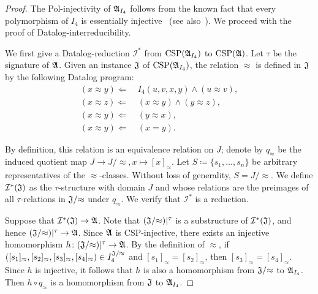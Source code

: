 \begin{proof}
The Pol-injectivity of $\mathfrak{A}_{I_4}$ follows from the known fact that every polymorphism of $I_4$ is essentially injective~\cite{BodChenPinsker} (see also~\cite[Lemma~7.5.1]{bodirsky2021complexity}). We proceed with the proof of Datalog-interreducibility.

We first give a Datalog-reduction $\mathcal{I}^{\ast}$ from $\mathrm{CSP}(\mathfrak{A}_{I_4})$ to $\mathrm{CSP}(\mathfrak{A})$.
%
Let $\tau$ be the signature of $\mathfrak{A}$.
%
Given an instance $\mathfrak{J}$ of $\mathrm{CSP}(\mathfrak{A}_{I_4})$, the relation $\approx$ is defined in $\mathfrak{J}$ by the following Datalog program:
%
\begin{align*}  
  (x\approx y)  \Leftarrow \ & I_4(u,v,x,y) \wedge  (u\approx v), \\
  (x\approx z)  \Leftarrow  \ &  (x\approx y)  \wedge (y\approx z), \\
  (x\approx y)  \Leftarrow \ &  (y\approx x), \\
  (x\approx y) \Leftarrow \ &  (x=y).
\end{align*} 

By definition, this relation is an equivalence relation on $J$; denote by $q_{\approx}$ be the induced quotient map $J\rightarrow J/{\approx}, x\mapsto [x]_{\approx} $.
%  
Let $S\coloneqq \{s_1,\dots, s_n\}$ be arbitrary representatives of the ${\approx}$-classes.
%
Without loss of generality, $S = J/{\approx} $.
%
We define $\mathcal{I}^{\ast}(\mathfrak{J})$ as the $\tau$-structure with domain $J$ and whose relations are the preimages of all $\tau$-relations in $\mathfrak{J}/{\approx}$ under $q_{\approx}$.
%
We verify that $\mathcal{I}^{\ast}$ is a reduction. 

Suppose that $\mathcal{I}^{\ast}(\mathfrak{J}) \rightarrow \mathfrak{A}$.
%
Note that $(\mathfrak{J}/{\approx})|^{\tau}$ is a substructure of $\mathcal{I}^{\ast}(\mathfrak{J})$, and hence $(\mathfrak{J}/{\approx})|^{\tau}\rightarrow \mathfrak{A}$.
% 
Since $\mathfrak{A}$ is CSP-injective, there exists an injective homomorphism $h \colon (\mathfrak{J}/{\approx})|^{\tau} \rightarrow \mathfrak{A}$.
%  
By the definition of $\approx$, if $([s_1]_{\approx},[s_2]_{\approx},[s_3]_{\approx},[s_4]_{\approx})\in I_4^{\mathfrak{J}/{\approx}}$ and $[s_1]_{\approx}=[s_2]_{\approx}$, then $[s_3]_{\approx}=[s_4]_{\approx}$.
%
Since $h$ is injective, it follows that $h$ is also a homomorphism from $\mathfrak{J}/{\approx}$ to $\mathfrak{A}_{I_4}$.
%
Then $h\circ q_{\approx} $ is a homomorphism from $\mathfrak{J}$ to $\mathfrak{A}_{I_4}$.
% 


\end{proof}

